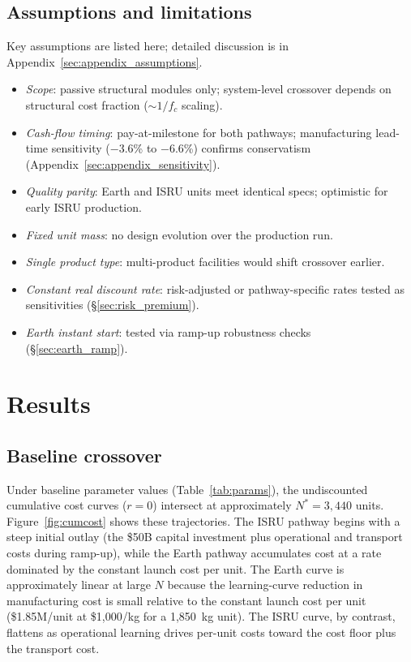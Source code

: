 \documentclass[preprint,12pt]{elsarticle}
\begin{document}
\subsection{Assumptions and limitations}

Key assumptions are listed here; detailed discussion is in Appendix~\ref{sec:appendix_assumptions}.
\begin{itemize}
  \item \emph{Scope}: passive structural modules only; system-level crossover depends on structural cost fraction ($\sim$$1/f_c$ scaling).
  \item \emph{Cash-flow timing}: pay-at-milestone for both pathways; manufacturing lead-time sensitivity ($-$3.6\% to $-$6.6\%) confirms conservatism (Appendix~\ref{sec:appendix_sensitivity}).
  \item \emph{Quality parity}: Earth and ISRU units meet identical specs; optimistic for early ISRU production.
  \item \emph{Fixed unit mass}: no design evolution over the production run.
  \item \emph{Single product type}: multi-product facilities would shift crossover earlier.
  \item \emph{Constant real discount rate}: risk-adjusted or pathway-specific rates tested as sensitivities (\S\ref{sec:risk_premium}).
  \item \emph{Earth instant start}: tested via ramp-up robustness checks (\S\ref{sec:earth_ramp}).
\end{itemize}

\section{Results}
\label{sec:results}

\subsection{Baseline crossover}

Under baseline parameter values (Table~\ref{tab:params}), the undiscounted cumulative cost curves ($r = 0$) intersect at approximately $N^* = 3{,}440$ units. Figure~\ref{fig:cumcost} shows these trajectories. The ISRU pathway begins with a steep initial outlay (the \$50B capital investment plus operational and transport costs during ramp-up), while the Earth pathway accumulates cost at a rate dominated by the constant launch cost per unit. The Earth curve is approximately linear at large $N$ because the learning-curve reduction in manufacturing cost is small relative to the constant launch cost per unit (\$1.85M/unit at \$1{,}000/kg for a 1{,}850~kg unit). The ISRU curve, by contrast, flattens as operational learning drives per-unit costs toward the cost floor plus the transport cost.
\end{document}
